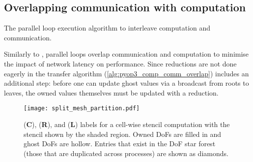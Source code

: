 \documentclass[thesis]{subfiles}
\begin{document}
\subsection{Overlapping communication with computation}
\label{sec:parallel_overlap_computation_communication}

\begin{algorithm}
  \caption{The  parallel loop execution algorithm to interleave computation and communication.}
  \begin{algorithmic}[1]
    \State {} 

     
      \State {}
    \EndFor

    \State {} 
    \State {} 

     
      \State {}
    \EndFor

    \State {} 

     
      \State {}
    \EndFor
  \end{algorithmic}
  \label{alg:pyop3_comp_comm_overlap}
\end{algorithm}

Similarly to ,  parallel loops overlap communication and computation to minimise the impact of network latency on performance.
Since reductions are not done eagerly in  the transfer algorithm (\cref{alg:pyop3_comp_comm_overlap}) includes an additional step: before one can update ghost values via a broadcast from roots to leaves, the owned values themselves must be updated with a reduction.

\begin{figure}
  \centering
  \texttt{[image: split\_mesh\_partition.pdf]}
  \caption{
    \coreiter{} (\textbf{C}), \rootiter{} (\textbf{R}), and \leafiter{} (\textbf{L}) labels for a cell-wise stencil computation with the stencil shown by the shaded region.
    Owned DoFs are filled in and ghost DoFs are hollow.
    Entries that exist in the DoF star forest (those that are duplicated across processes) are shown as diamonds.
  }
  \label{fig:split_mesh_partition}
\end{figure}
\end{document}
